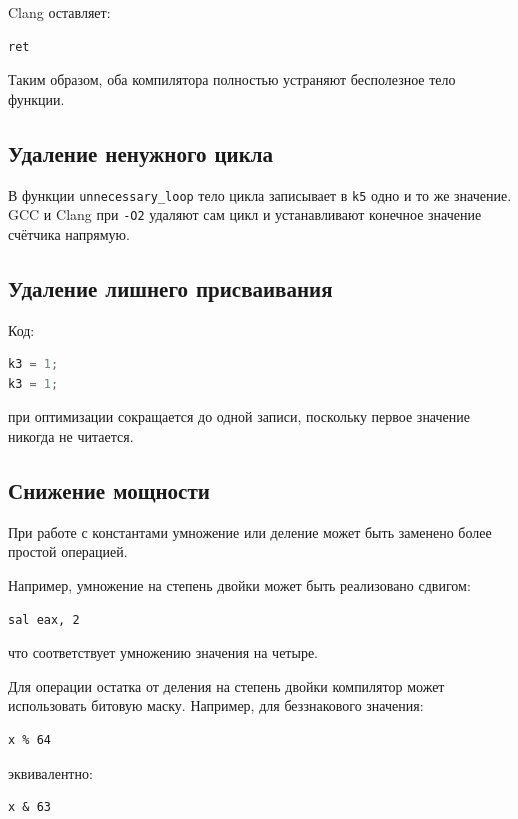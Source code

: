 \documentclass[12pt,a4paper]{article}
\begin{document}
Clang оставляет:

\begin{lstlisting}
ret
\end{lstlisting}

Таким образом, оба компилятора полностью устраняют бесполезное тело функции.

\subsection{Удаление ненужного цикла}

В функции \texttt{unnecessary\_loop} тело цикла записывает в \texttt{k5} одно и то же значение. GCC и Clang при \texttt{-O2} удаляют сам цикл и устанавливают конечное значение счётчика напрямую.

\subsection{Удаление лишнего присваивания}

Код:

\begin{lstlisting}[language=C]
k3 = 1;
k3 = 1;
\end{lstlisting}

при оптимизации сокращается до одной записи, поскольку первое значение никогда не читается.

\subsection{Снижение мощности}

При работе с константами умножение или деление может быть заменено более простой операцией.

Например, умножение на степень двойки может быть реализовано сдвигом:

\begin{lstlisting}
sal eax, 2
\end{lstlisting}

что соответствует умножению значения на четыре.

Для операции остатка от деления на степень двойки компилятор может использовать битовую маску. Например, для беззнакового значения:

\begin{lstlisting}
x % 64
\end{lstlisting}

эквивалентно:

\begin{lstlisting}
x & 63
\end{lstlisting}
\end{document}
